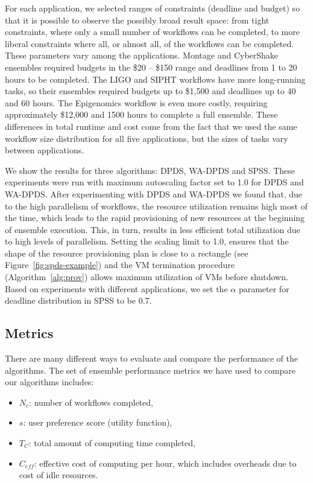 \documentclass{sig-alternate}
\begin{document}
For each application, we selected ranges of constraints (deadline and budget) so
that it is possible to observe the possibly broad result space: from tight 
constraints, where only a small number of workflows can be completed, to 
more liberal constraints where all, or almost all, of the workflows can be 
completed. These parameters vary among the applications. Montage and CyberShake 
ensembles required budgets in the \$20 -- \$150 range and deadlines from 1 to
20 hours to be completed. The LIGO and SIPHT workflows have more long-running
tasks, so their ensembles required budgets up to \$1,500 and deadlines up to 
40 and 60 hours. The Epigenomics workflow is even more costly, requiring 
approximately \$12,000 and 1500 hours to complete a full ensemble. These
differences in total runtime and cost come from the fact that we used the
same workflow size distribution for all five applications, but
the sizes of tasks vary between applications.

We show the results for three algorithms: DPDS, WA-DPDS and SPSS. These 
experiments were run with maximum autoscaling factor set to 1.0 for
DPDS and WA-DPDS. After experimenting with DPDS and WA-DPDS we found that, 
due to the high parallelism of workflows, the resource utilization remains 
high most of the time, which leads to the rapid provisioning of new resources 
at the beginning of ensemble execution. This, in turn, results in less 
efficient total utilization due to high levels of parallelism. Setting the 
scaling limit to 1.0, ensures that the shape of the resource provisioning 
plan  is close to a rectangle (see Figure~\ref{fig:spds-example}) and the VM 
termination procedure (Algorithm~\ref{alg:prov}) allows maximum utilization 
of VMs before shutdown. Based on experiments with different applications, 
we set the $\alpha$ parameter for deadline distribution in SPSS to be 0.7.


\subsection{Metrics}

There are many different ways to evaluate and compare the performance of 
the algorithms. The set of ensemble performance metrics we have used to
compare our algorithms includes:

\begin{itemize}
  \item $N_c$: number of workflows completed,
  \item $s$: user preference score (utility function),
  \item $T_C$: total amount of computing time completed,
  \item $C_{eff}$: effective cost of computing per hour, which includes
  overheads due to cost of idle resources.
\end{itemize}
\end{document}

